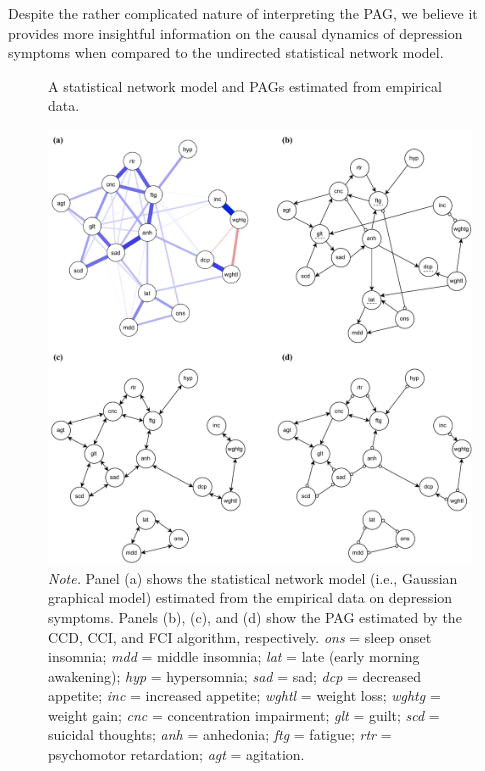 \documentclass[twoside, 11pt]{article}
\begin{document}
Despite the rather complicated nature of interpreting the PAG, we believe it provides more insightful information on the causal dynamics of depression symptoms when compared to the undirected statistical network model.


\begin{figure}[!htbp]
    \centering
        \caption{A statistical network model and PAGs estimated from empirical data.}
        \vspace{1mm}
        \includegraphics[width=1\textwidth]{figures/Fig19.pdf}
        \vspace*{1mm}
        \caption*{\small{\textit{Note.} Panel (a) shows the statistical network model (i.e., Gaussian graphical model) estimated from the empirical data on depression symptoms. Panels (b), (c), and (d) show the PAG estimated by the CCD, CCI, and FCI algorithm, respectively. \textit{ons} = sleep onset insomnia; \textit{mdd} = middle insomnia; \textit{lat} = late (early morning awakening); \textit{hyp} = hypersomnia; \textit{sad} = sad; \textit{dcp} = decreased appetite; \textit{inc} = increased appetite; \textit{wghtl} = weight loss; \textit{wghtg} = weight gain; \textit{cnc} = concentration impairment; \textit{glt} = guilt; \textit{scd} = suicidal thoughts; \textit{anh} = anhedonia; \textit{ftg} = fatigue; \textit{rtr} = psychomotor retardation; \textit{agt} = agitation.}}
    \label{fig:20}
\end{figure}
\end{document}
